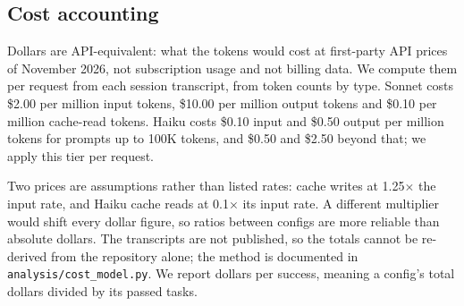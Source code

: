 \subsection{Cost accounting}
\label{sec:cost-accounting}

Dollars are API-equivalent: what the tokens would cost at first-party API
prices of November 2026, not subscription usage and not billing data. We
compute them per request from each session transcript, from token counts by
type. Sonnet costs \$2.00 per million input tokens, \$10.00 per million
output tokens and \$0.10 per million cache-read tokens. Haiku costs
\$0.10 input and \$0.50 output per million tokens for prompts up to 100K
tokens, and \$0.50 and \$2.50 beyond that; we apply this tier per request.

Two prices are assumptions rather than listed rates: cache writes at
1.25$\times$ the input rate, and Haiku cache reads at 0.1$\times$ its
input rate. A different multiplier would shift every dollar figure, so
ratios between configs are more reliable than absolute dollars. The
transcripts are not published, so the totals cannot be re-derived from the
repository alone; the method is documented in \texttt{analysis/cost\_model.py}.
We report dollars per success, meaning a config's total dollars
divided by its passed tasks.
